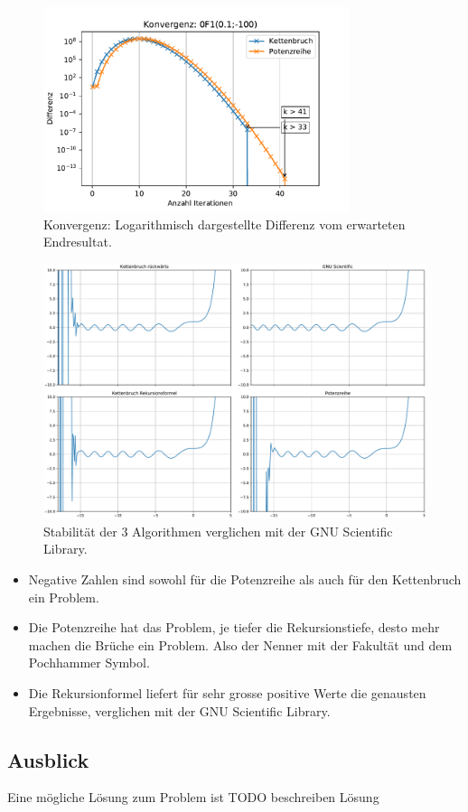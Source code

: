 \begin{figure}
    \centering
    \includegraphics[width=0.8\textwidth]{papers/0f1/images/konvergenzNegativ.pdf}
    \caption{Konvergenz: Logarithmisch dargestellte Differenz vom erwarteten Endresultat.
    \label{0f1:ausblick:plot:konvergenz:negativ}}
\end{figure}

\begin{figure}
    \centering
    \includegraphics[width=1\textwidth]{papers/0f1/images/stabilitaet.pdf}
    \caption{Stabilität der 3 Algorithmen verglichen mit der GNU Scientific Library.
    \label{0f1:ausblick:plot:airy:stabilitaet}}
\end{figure}

\begin{itemize}
    \item Negative Zahlen sind sowohl für die Potenzreihe als auch für den Kettenbruch ein Problem.
    \item Die Potenzreihe hat das Problem, je tiefer die Rekursionstiefe, desto mehr machen die Brüche ein Problem. Also der Nenner mit der Fakultät und dem Pochhammer Symbol.
    \item Die Rekursionformel liefert für sehr grosse positive Werte die genausten Ergebnisse, verglichen mit der GNU Scientific Library.
\end{itemize}


\subsection{Ausblick
\label{0f1:subsection:ausblick}}
Eine mögliche Lösung zum Problem ist \cite{0f1:SeminarNumerik}
{\color{red} TODO beschreiben Lösung}

